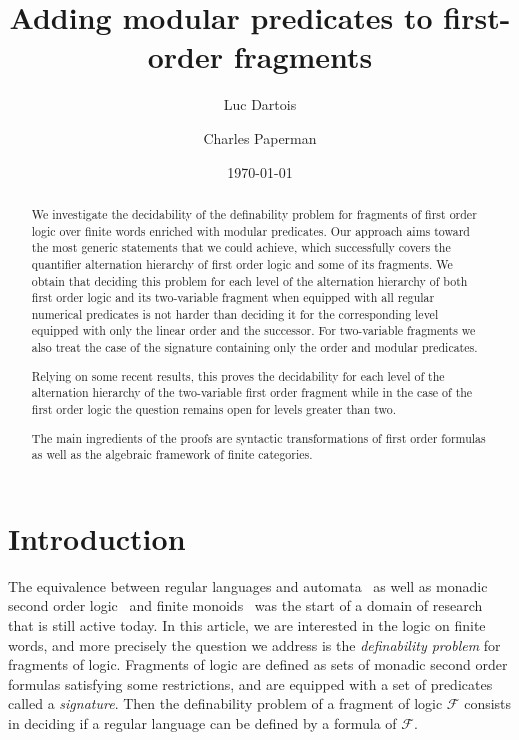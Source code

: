 \documentclass[submission,hidelink]{dmtcs-episciences}
\author[L. Dartois, C. Paperman]{Luc Dartois\affiliationmark{1,2}
  \and Charles Paperman\affiliationmark{3}}
\title[Adding modular predicates]{Adding modular predicates to first-order fragments}
\affiliation{
LIF, Aix-Marseille Université, France\\
  Université Libre de Bruxelles, Belgium\\
  Warsaw University, Poland}
\date{\today}
\newcommand{\cF}{\mathcal{F}}
\begin{document}
\maketitle

\begin{abstract}
We investigate the decidability of the definability problem for fragments of first order logic over finite words enriched with modular predicates.
Our approach aims toward the most generic statements that we could achieve, which successfully covers the quantifier alternation hierarchy of first order logic and some of its fragments.
 We obtain that deciding this problem for each level of the alternation hierarchy of
 both first order logic and its two-variable fragment when equipped with all regular numerical predicates
 is not harder than deciding it for the corresponding level
 equipped with only the linear order and the successor. For two-variable fragments we also treat the case of the signature containing
 only the order
 and modular predicates.

Relying on some recent results, this proves the decidability for each level of the alternation hierarchy of the two-variable first order fragment
while in the case of the first order logic the question remains open for levels greater than two.

The main ingredients of the proofs are syntactic transformations of first order formulas as well as the algebraic framework of finite categories.
\end{abstract}



\section{Introduction}

The equivalence between regular languages and automata~\citep{RabinScott59}
 as well as monadic second order
logic~\citep{Buchi60} and finite monoids~\citep{Nerode59} was the start of a
domain of research that is still active today.
	In this article, we are  interested in the logic on finite words, and more precisely the
	question we address is the \emph{definability problem} for fragments of logic.
	Fragments of logic are defined as sets of monadic second order formulas satisfying some restrictions, and are
	equipped with a set of predicates called a \emph{signature}.
	Then the definability problem of a fragment of logic $\cF$ consists in deciding
	 if
	a regular language can be defined by a formula of $\cF$.
\end{document}
